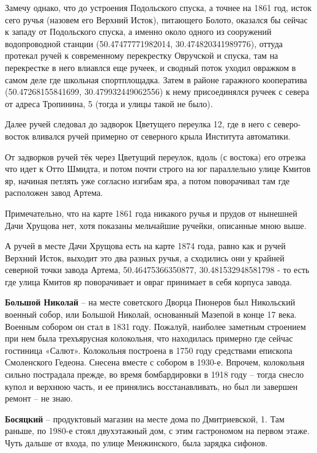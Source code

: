 Замечу однако, что до устроения Подольского спуска, а точнее на 1861 год, исток сего ручья (назовем его Верхний Исток), питающего Болото, оказался бы сейчас к западу от Подольского спуска, а именно около одного из сооружений водопроводной станции (50.47477771982014, 30.474820341989776), оттуда протекал ручей к современному перекрестку Овручской и спуска, там на перекрестке в него влиавлся еще ручеек, и сводный поток уходил овражком в самом деле где школьная спортплощадка. Затем в районе гаражного кооператива (50.47268155841699, 30.479932449062556) к нему присоединялся ручеек с севера от адреса Тропинина, 5 (тогда и улицы такой не было).

Далее ручей следовал до задворок Цветущего переулка 12, где в него с северо-восток вливался ручей примерно от северного крыла Института автоматики.

От задворков ручей тёк через Цветущий переулок, вдоль (с востока) его отрезка что идет к Отто Шмидта, и потом почти строго на юг параллельно улице Кмитов яр, начиная петлять уже согласно изгибам яра, а потом поворачивал там где расположен завод Артема.

Примечательно, что на карте 1861 года никакого ручья и прудов от нынешней Дачи Хрущова нет, хотя показаны мельчайшие ручейки, описанные мною выше. 

А ручей в месте Дачи Хрущова есть на карте 1874 года, равно как и ручей Верхний Исток, выходит это два разных ручья, а сходились они у крайней северной точки завода Артема, 50.46475366350877, 30.481532948581798 - то есть где улица Кмитов яр поворачивает и овраг принимает в себя корпуса завода.\\

\medskip

\textbf{Большой Николай} – на месте советского Дворца Пионеров был Никольский военный собор, или Большой Николай, основанный Мазепой в конце 17 века. Военным собором он стал в 1831 году. Пожалуй, наиболее заметным строением при нем была трехъярусная колокольня, что находилась примерно где сейчас гостиница «Салют». Колокольня построена в 1750 году средствами епископа Смоленского Гедеона. Снесена вместе с собором в 1930-е. Впрочем, колокольня сильно пострадала прежде, во время бомбардировки в 1918 году – тогда снесло купол и верхнюю часть, и ее принялись восстанавливать, но был ли завершен ремонт – не знаю.\\

\medskip

\textbf{Босяцкий} – продуктовый магазин на месте дома по Дмитриевской, 1. Там раньше, по 1980-е стоял двухэтажный дом, с этим гастрономом на первом этаже. Чуть дальше от входа, по улице Менжинского, была зарядка сифонов.\\

